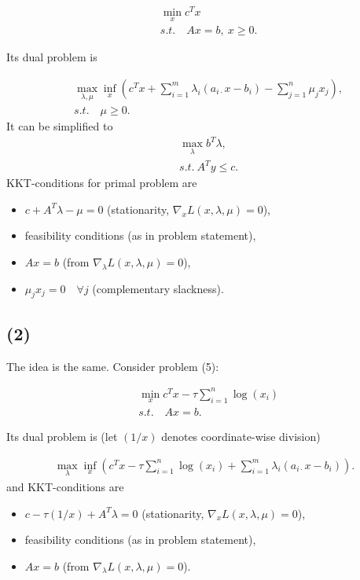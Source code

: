 \documentclass[a4paper,12pt,russian]{extreport}
\begin{document}
\begin{align*}
&\min_x c^Tx\\
&s.t.\quad Ax=b, ~x \geq 0.
\end{align*}

Its dual problem is 

\begin{align*}
&\max_{\lambda,\mu} \inf_x \left( c^Tx +\sum_{i=1}^m \lambda_i(a_{i\cdot}x-b_i) - \sum_{j=1}^n\mu_jx_j \right),\\
&s.t. \quad \mu\geq 0.
\end{align*}
It can be simplified to
\begin{align*}
&\max_{\lambda} b^T\lambda,\\
&s.t.~ A^Ty \leq c.
\end{align*}
KKT-conditions for primal problem are
\begin{itemize}
\item $c+A^T\lambda-\mu =0$ (stationarity, $\nabla_x L(x,\lambda,\mu)=0$),
\item feasibility conditions (as in problem statement),
\item $Ax=b$ (from $\nabla_\lambda L(x,\lambda,\mu)=0 $),
\item $\mu_jx_j=0 \quad \forall j$ (complementary slackness).
\end{itemize}

\subsection*{(2)}

The idea is the same. Consider problem (5):

\begin{align*}
&\min_x c^Tx - \tau\sum_{i=1}^n \log(x_i)\\
&s.t.\quad Ax=b.
\end{align*}

Its dual problem is (let $(1/x)$ denotes coordinate-wise division)

\begin{align*}
\max_{\lambda} \inf_x \left( c^Tx -\tau\sum_{i=1}^n \log(x_i) +\sum_{i=1}^m \lambda_i(a_{i\cdot}x-b_i) \right).
\end{align*}
and KKT-conditions are
\begin{itemize}
\item $c-\tau(1/x)+A^T\lambda =0$ (stationarity, $\nabla_x L(x,\lambda,\mu)=0$),
\item feasibility conditions (as in problem statement),
\item $Ax=b$ (from $\nabla_\lambda L(x,\lambda,\mu)=0 $).
\end{itemize}
\end{document}
